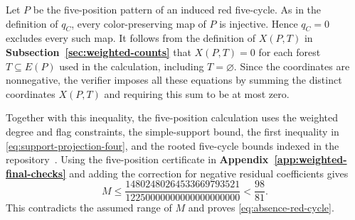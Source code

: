 Let $P$ be the five-position pattern of an induced red five-cycle.
As in the definition of $q_C$, every color-preserving map of $P$ is injective. Hence $q_C=0$ excludes every such map. It follows from
the definition of $X(P,T)$ in
\textbf{Subsection~\ref{sec:weighted-counts}} that $X(P,T)=0$ for
each forest $T\subseteq E(P)$ used in the calculation, including
$T=\varnothing$. Since the coordinates are nonnegative, the verifier
imposes all these equations by summing the distinct coordinates
$X(P,T)$ and requiring this sum to be at most zero.

Together with this inequality, the five-position calculation uses
the weighted degree and flag constraints, the simple-support bound,
the first inequality in \eqref{eq:support-projection-four}, and the
rooted five-cycle bounds indexed in the repository~\cite{FGSTCode}.
Using the five-position certificate in
\textbf{Appendix~\ref{app:weighted-final-checks}} and adding the correction for
negative residual coefficients gives
\[
 M\leq\frac{14802480264533669793521}{12250000000000000000000}
   <\frac{98}{81}.
\]
This contradicts the assumed range of $M$ and proves
\eqref{eq:absence-red-cycle}.
